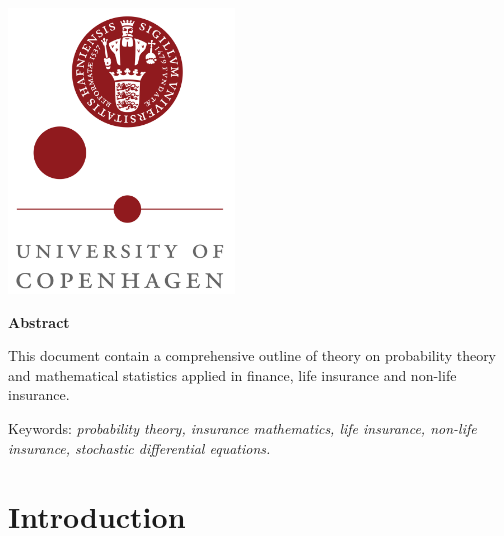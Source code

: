 \documentclass[
]{book}
\begin{document}
{\begin{titlepage}




\includegraphics[width = 0.45\textwidth]{logo_ku.png}%
 

\vfill %
\end{titlepage}

\thispagestyle{empty}
\begin{center}
\textbf{\large Abstract}
\end{center}

This document contain a comprehensive outline of theory on probability theory and mathematical statistics applied in finance, life insurance and non-life insurance.

Keywords: \emph{probability theory, insurance mathematics, life insurance,
non-life insurance, stochastic differential equations.}
\vfill
\pagebreak

\setcounter{tocdepth}{3}
\tableofcontents
}
\thispagestyle{empty}
\newpage
\setcounter{page}{1}
\pagestyle{fancy}
\fancyhf{}
\fancyhead[LE]{\fontsize{10}{12} \selectfont\nouppercase{\rightmark\hfill\leftmark}}
\fancyhead[RO]{\fontsize{10}{12} \selectfont\nouppercase{\leftmark\hfill\rightmark}}
\fancyfoot[LE,RO]{\hfill\thepage\hfill}
\hypertarget{introduction}{%
\chapter{Introduction}\label{introduction}}
\end{document}
